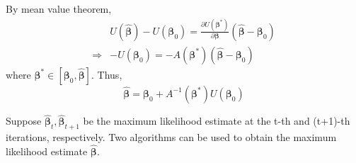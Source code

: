 By mean value theorem,
\begin{equation*}
    \begin{aligned}
                    & U\left(\hat{\boldsymbol{\beta}}\right)-U\left(\boldsymbol{\beta}_{0}\right)=\frac{\partial U\left(\boldsymbol{\beta}^{*}\right)}{\partial\boldsymbol{\beta}}\left(\hat{\boldsymbol{\beta}}-\boldsymbol{\beta}_{0}\right) \\
        \Rightarrow & -U\left(\boldsymbol{\beta}_{0}\right)=-A\left(\boldsymbol{\beta}^{*}\right)\left(\hat{\boldsymbol{\beta}}-\boldsymbol{\beta}_{0}\right)
    \end{aligned}
\end{equation*}
where $\boldsymbol{\beta}^{*}\in\left[\boldsymbol{\beta}_{0},\hat{\boldsymbol{\beta}}\right]$. Thus,
\begin{equation*}
    \hat{\boldsymbol{\beta}}=\boldsymbol{\beta}_{0}+A^{-1}\left(\boldsymbol{\beta}^{*}\right)U\left(\boldsymbol{\beta}_{0}\right)
\end{equation*}

Suppose $\hat{\boldsymbol{\beta}}_{t},\hat{\boldsymbol{\beta}}_{t+1}$ be the maximum likelihood estimate at the t-th and (t+1)-th iterations, respectively. Two algorithms can be used to obtain the maximum likelihood estimate $\hat{\boldsymbol{\beta}}$.

